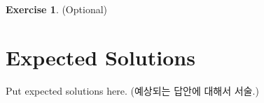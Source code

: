 \documentclass[a4paper, 11pt]{article}
\theoremstyle{definition}
\newtheorem{exercise}{Exercise}
\begin{document}
\begin{exercise} (Optional)

\end{exercise}

\section{Expected Solutions}

Put expected solutions here.
(예상되는 답안에 대해서 서술.)



\end{document}
